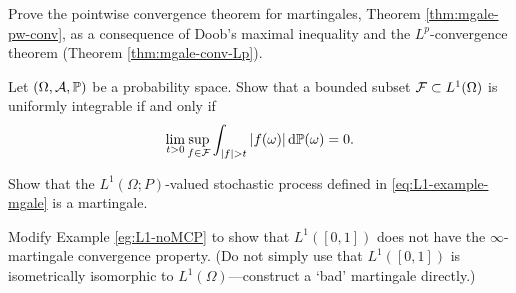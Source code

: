 \begin{exercise}\label{ex:mgale-conv}
  Prove the pointwise convergence theorem for martingales, Theorem \ref{thm:mgale-pw-conv}, as a consequence of Doob's maximal inequality and the $L^p$-convergence theorem (Theorem \ref{thm:mgale-conv-Lp}).
\end{exercise}

\begin{exercise}\label{ex:UI-characterisation}
  Let $(\Omega,\mathcal{A},\mathbb{P})$ be a probability space.
  Show that a bounded subset $\mathcal{F} \subset L^1(\Omega)$ is uniformly integrable if and only if
  \begin{equation*}
    \lim_{t > 0} \sup_{f \in \mathcal{F}} \int_{|f| > t} |f(\omega)| \, \mathrm{d}\mathbb{P}(\omega) = 0.
  \end{equation*}
\end{exercise}


\begin{exercise}\label{ex:mgale-check}
  Show that the $L^1(\Omega;P)$-valued stochastic process defined in \eqref{eq:L1-example-mgale} is a martingale. 
\end{exercise}

\begin{exercise}\label{ex:L1-noMCP-var}
  Modify Example \ref{eg:L1-noMCP} to show that $L^1([0,1])$ does not have the $\infty$-martingale convergence property. (Do not simply use that $L^1([0,1])$ is isometrically isomorphic to $L^1(\Omega)$---construct a `bad' martingale directly.)
\end{exercise}




